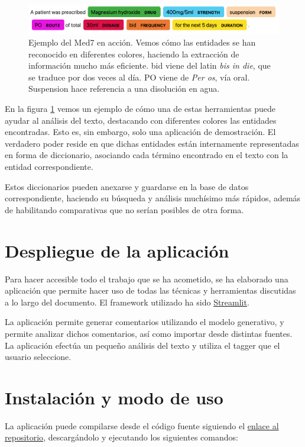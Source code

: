 \begin{figure}[h]
	\centering
	\includegraphics[width=.9\textwidth]{media/med7_example.png}
	\caption{Ejemplo del Med7 en acción. Vemos cómo las entidades se han reconocido en diferentes colores, haciendo la extracción de información mucho más eficiente. bid viene del latin \textit{bis in die}, que se traduce por dos veces al día. PO viene de \textit{Per os}, vía oral. Suspension hace referencia a una disolución en agua.}
	\label{fig:med7}
\end{figure}

En la figura \ref{fig:med7} vemos un ejemplo de cómo una de estas herramientas puede ayudar al análisis del texto, destacando con diferentes colores las entidades encontradas. Esto es, sin embargo, solo una aplicación de demostración. El verdadero poder reside en que dichas entidades están internamente representadas en forma de diccionario, asociando cada término encontrado en el texto con la entidad correspondiente. 

Estos diccionarios pueden anexarse y guardarse en la base de datos correspondiente, haciendo su búsqueda y análisis muchísimo más rápidos, además de habilitando comparativas que no serían posibles de otra forma.


\section{Despliegue de la aplicación}

Para hacer accesible todo el trabajo que se ha acometido, se ha elaborado una aplicación que permite hacer uso de todas las técnicas y herramientas discutidas a lo largo del documento. El framework utilizado ha sido \href{https://streamlit.io}{Streamlit}.

La aplicación permite generar comentarios utilizando el modelo generativo, y permite analizar dichos comentarios, así como importar desde distintas fuentes. La aplicación efectúa un pequeño análisis del texto y utiliza el tagger que el usuario seleccione.


\section{Instalación y modo de uso}
La aplicación puede compilarse desde el código fuente siguiendo el \href{https://github.com/jesi-rgb/medical-text-analysis}{enlace al repositorio}, descargándolo y ejecutando los siguientes comandos:

